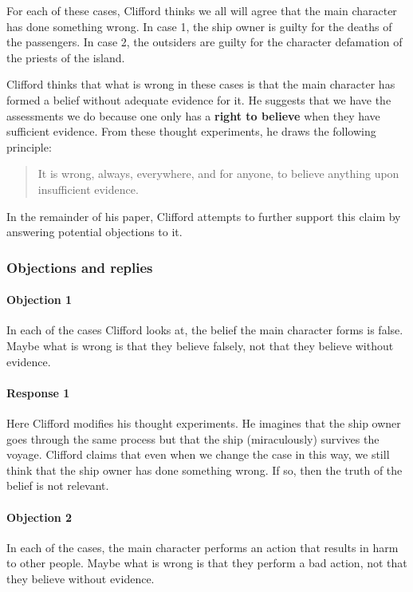 \documentclass[letterpaper,10pt]{article}
\begin{document}
For each of these cases, Clifford thinks we all will agree that the main character has done something wrong. In case 1, the ship owner is guilty for the deaths of the passengers.  In case 2, the outsiders are guilty for the character defamation of the priests of the island.

Clifford thinks that what is wrong in these cases is that the main character has formed a belief without adequate evidence for it. He suggests that we have the assessments we do because one only has a \textbf{right to believe} when they have sufficient evidence. From these thought experiments, he draws the following principle:

\begin{quote}
 It is wrong, always, everywhere, and for anyone, to believe anything upon insufficient evidence.
\end{quote}

In the remainder of his paper, Clifford attempts to further support this claim by answering potential objections to it.

\subsubsection{Objections and replies}

\paragraph{Objection 1} In each of the cases Clifford looks at, the belief the main character forms is false. Maybe what is wrong is that they believe falsely, not that they believe without evidence.

\paragraph{Response 1} Here Clifford modifies his thought experiments. He imagines that the ship owner goes through the same process but that the ship (miraculously) survives the voyage.  Clifford claims that even when we change the case in this way, we still think that the ship owner has done something wrong.  If so, then the truth of the belief is not relevant.

\paragraph{Objection 2} In each of the cases, the main character performs an action that results in harm to other people.  Maybe what is wrong is that they perform a bad action, not that they believe without evidence.
\end{document}
